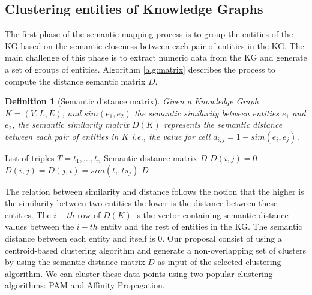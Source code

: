\documentclass{ieeeaccess}
\newtheorem{Definition}{Definition}
\begin{document}
\subsection{Clustering entities of Knowledge Graphs}

The first phase of the semantic mapping process is to
group the entities of the KG based on the semantic 
closeness between each pair of entities in the KG. 
The main challenge of this phase is to extract 
numeric data from the KG and generate a set of
groups of entities. Algorithm \ref{alg:matrix}
describes the process to compute the distance
semantic matrix $D$. 

\begin{Definition}[Semantic distance matrix]
Given a Knowledge Graph $K = (V, L, E)$, and $sim(e_{1}, 
e_{2})$ the semantic similarity between entities $e_{1}$ 
and $e_{2}$, the semantic similarity matrix $D(K)$ represents 
the semantic distance between each pair of entities in $K$ i.e., 
the value for cell  $d_{i,j} = 1 - sim(e_{i}, e_{j})$.
\end{Definition}

\begin{algorithm}
 \caption{Algorithm to build the semantic distance matrix}
 \label{alg:matrix}
 \begin{algorithmic}[1]
 \renewcommand{\algorithmicrequire}{\textbf{Input:}}
 \renewcommand{\algorithmicensure}{\textbf{Output:}}
 \REQUIRE List of triples $T = {t_{1}, \dots, t_{n}}$
 \ENSURE  Semantic distance matrix $D$
  \STATE $D(i, j) = 0$
  \ELSE
  \STATE $D(i,j) = D(j, i) = sim(t_{i}, ts_{j})$
  \ENDIF
  \ENDFOR
  \ENDFOR
 \RETURN $D$ 
 \end{algorithmic} 
 \end{algorithm}

The relation between similarity and distance follows 
the notion that the higher is the similarity between 
two entities the lower is the distance between these 
entities. The $i-th$ row of $D(K)$ is the vector 
containing semantic distance values between the $i-th$
entity and the rest of entities in the KG. The semantic
distance between each entity and itself is $0$. Our proposal consist of using a centroid-based 
clustering algorithm and generate a non-overlapping
set of clusters by using the semantic distance matrix
$D$ as input of the selected clustering algorithm. We can cluster these data points using two popular clustering algorithms: PAM and Affinity Propagation. 
\end{document}
